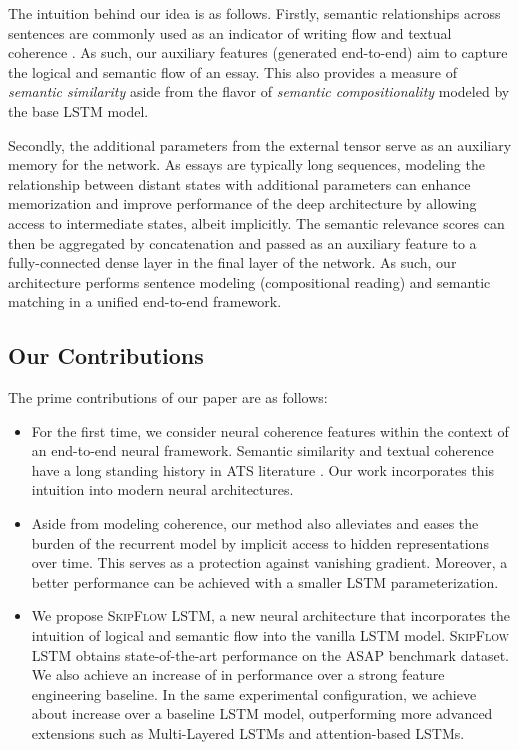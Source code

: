 \documentclass[letterpaper]{article}
\begin{document}
The intuition behind our idea is as follows. Firstly, semantic relationships across sentences are commonly used as an indicator of writing flow and textual coherence \cite{wiemer2000select,higgins2004evaluating,higgins2007sentence,DBLP:conf/emnlp/ChenH13,somasundaran2014lexical}. As such, our auxiliary features (generated end-to-end) aim to capture the logical and semantic flow of an essay. This also provides a measure of \textit{semantic similarity} aside from the flavor of \textit{semantic compositionality} modeled by the base LSTM model. 

Secondly, the additional parameters from the external tensor serve as an auxiliary memory for the network. As essays are typically long sequences, modeling the relationship between distant states with additional parameters can enhance memorization and improve performance of the deep architecture by allowing access to intermediate states, albeit implicitly. The semantic relevance scores can then be aggregated by concatenation and passed as an auxiliary feature to a fully-connected dense layer in the final layer of the network. As such, our architecture performs sentence modeling (compositional reading) and semantic matching in a unified end-to-end framework. 

\subsection{Our Contributions}

The prime contributions of our paper are as follows:
\begin{itemize}
\item For the first time, we consider neural coherence features within the context of an end-to-end neural framework. Semantic similarity and textual coherence have a long standing history in ATS literature \cite{wiemer2000select,higgins2007sentence,higgins2004evaluating}. Our work incorporates this intuition into modern neural architectures. 
\item Aside from modeling coherence, our method also alleviates and eases the burden of the recurrent model by implicit access to hidden representations over time. This serves as a protection against vanishing gradient. Moreover, a better performance can be achieved with a smaller LSTM parameterization. 
\item We propose \textsc{SkipFlow} LSTM, a new neural architecture that incorporates the intuition of logical and semantic flow into the vanilla LSTM model. \textsc{SkipFlow} LSTM obtains state-of-the-art performance on the ASAP benchmark dataset. We also achieve an increase of  in performance over a strong feature engineering baseline. In the same experimental configuration, we achieve about  increase over a baseline LSTM model, outperforming more advanced extensions such as Multi-Layered LSTMs and attention-based LSTMs. 
\end{itemize}
\end{document}
